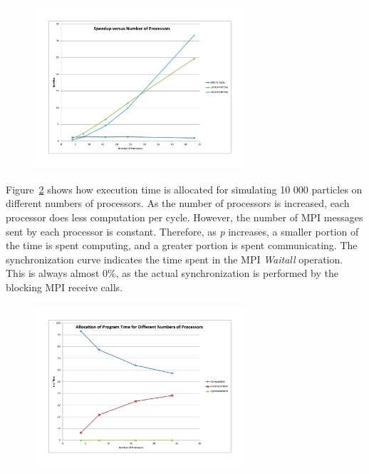 \documentclass[11pt]{article} %
\begin{document}
\begin{figure}[!h]
\centering
\includegraphics*[width=0.7\textwidth, viewport= 70 70 730 550]{figures/mpips_speedup_vs_p}
\caption{}
\label{mpips_speedup_vs_p}
\end{figure}

Figure~\ref{mpips_timealloc_vs_p} shows how execution time is allocated for simulating 10 000 particles on different numbers of processors. As the number of processors is increased, each processor does less computation per cycle. However, the number of MPI messages sent by each processor is constant. Therefore, as {\em p} increases, a smaller portion of the time is spent computing, and a greater portion is spent communicating. The synchronization curve indicates the time spent in the MPI {\em Waitall} operation. This is always almost 0\%, as the actual synchronization is performed by the blocking MPI receive calls.

\begin{figure}[!h]
\centering
\includegraphics*[width=0.7\textwidth, viewport= 70 70 730 550]{figures/mpips_timealloc_vs_p}
\caption{}
\label{mpips_timealloc_vs_p}
\end{figure}
\end{document}
